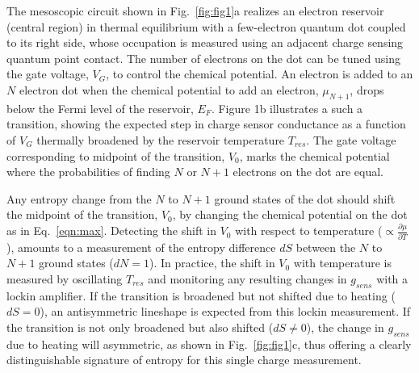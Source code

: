 \documentclass[twocolumn,showpacs,preprintnumbers,amsmath,amssymb,pra,aps,superscriptaddress]{revtex4-1}
\begin{document}
The mesoscopic circuit shown in Fig.~\ref{fig:fig1}a realizes an electron reservoir (central region) in thermal equilibrium with a few-electron quantum dot coupled to its right side, whose occupation is measured using an adjacent charge sensing quantum point contact\cite{Staring2007, Frolov2009, Thierschmann2015}. The number of electrons on the dot can be tuned using the gate voltage, $V_G$, to control the chemical potential.  An electron is added to an $N$ electron dot when the chemical potential to add an electron, $\mu_{N+1}$, drops below the Fermi level of the reservoir, $E_F$.  Figure 1b illustrates a such a transition, showing the expected step in charge sensor conductance as a function of $V_G$ thermally broadened by the reservoir temperature $T_{res}$. The gate voltage corresponding to midpoint of the transition, $V_0$, marks the chemical potential where the probabilities of finding $N$ or $N+1$ electrons on the dot are equal.

Any entropy change from the $N$ to $N+1$ ground states of the dot should shift the midpoint of the transition, $V_0$, by changing the chemical potential on the dot as in Eq.~\ref{eqn:max}.  Detecting the shift in $V_0$ with respect to temperature (${\propto}\frac{\partial \mu}{\partial T}$), amounts to a measurement of the entropy difference $dS$ between the $N$ to $N+1$ ground states ($dN=1$).  In practice, the shift in $V_0$ with temperature is measured by oscillating $T_{res}$ and monitoring any resulting changes in $g_{sens}$ with a lockin amplifier.  If the transition is broadened but not shifted due to heating ($dS=0$), an antisymmetric lineshape is expected from this lockin measurement.  If the transition is not only broadened but also shifted ($dS\neq0$), the change in $g_{sens}$ due to heating will asymmetric, as shown in Fig.~\ref{fig:fig1}c, thus offering a clearly distinguishable signature of entropy for this single charge measurement.
\end{document}
